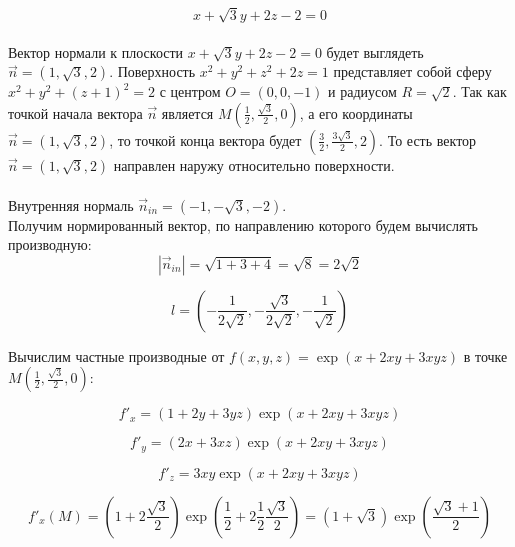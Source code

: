 \documentclass[a5paper, 10pt]{article}
\theoremstyle{definition}
\theoremstyle{plain}
\theoremstyle{remark}
\begin{document}
\begin{equation}
x  + \sqrt{3}y + 2z - 2= 0
\end{equation}
\\
Вектор нормали к плоскости $x  + \sqrt{3}y + 2z - 2= 0$ будет выглядеть $\vec{n} = \left( 1, \sqrt{3}, 2 \right)$. Поверхность  $x^2 + y^2 + z^2 + 2z = 1$ представляет собой сферу  $x^2 + y^2 + \left( z + 1\right)^2 = 2$ с центром $O = (0, 0, -1)$ и радиусом $R = \sqrt{2}$. Так как точкой начала вектора $\vec{n}$ является  $M \left( \frac{1}{2}, \frac{\sqrt{3}}{2}, 0 \right)$, а его координаты  $\vec{n} = \left( 1, \sqrt{3}, 2 \right)$, то точкой конца вектора будет $\left(  \frac{3}{2}, \frac{3 \sqrt{3}}{2}, 2 \right)$. То есть вектор $\vec{n} = \left( 1, \sqrt{3}, 2 \right)$ направлен наружу относительно поверхности.\\
\\
Внутренняя нормаль $\vec{n}_{in} = \left( -1, -\sqrt{3}, -2 \right)$. \\
Получим нормированный вектор, по направлению которого будем вычислять производную:
\begin{equation}
\left|\vec{n}_{in}  \right| = \sqrt{1 + 3 + 4} =  \sqrt{8} = 2\sqrt{2}
\end{equation}

\begin{equation}
l = \left( -\frac{1}{2\sqrt{2}}, - \frac{\sqrt{3}}{2\sqrt{2}}, - \frac{1}{\sqrt{2}} \right)
\end{equation}

Вычислим частные производные от $f(x, y, z) = \exp(x + 2xy + 3xyz)$ в точке $M \left( \frac{1}{2}, \frac{\sqrt{3}}{2}, 0 \right)$:

\begin{equation}
f'_x = \left(1 + 2y + 3yz \right) \exp(x + 2xy + 3xyz)
\end{equation}

\begin{equation}
f'_y  = \left( 2x + 3xz \right) \exp(x + 2xy + 3xyz)
\end{equation}

\begin{equation}
f'_z   = 3xy \exp(x + 2xy + 3xyz)
\end{equation}

\begin{equation}
f'_x  \left( M \right) =  \left(1 + 2 \frac{\sqrt{3}}{2} \right) \exp \left( \frac{1}{2} + 2 \frac{1}{2}\frac{\sqrt{3}}{2} \right) =
\left(1 + \sqrt{3} \right) \exp \left( \frac{\sqrt{3} + 1}{2} \right) 
\end{equation}
\end{document}
